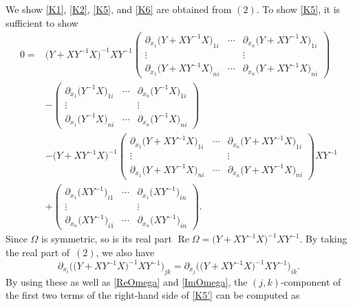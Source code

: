 \documentclass[10pt,a4paper]{amsart}
\numberwithin{equation}{section}
\def\re{\operatorname{Re}}
\begin{document}
We show \eqref{K1}, \eqref{K2}, \eqref{K5}, and \eqref{K6} are obtained from $(2)$. %
To show \eqref{K5}, it is sufficient to show
\begin{align}
0={}& \bigl(Y+XY^{-1}X\bigr)^{-1}XY^{-1}
\begin{pmatrix}
\partial_{x_1}\bigl(Y+XY^{-1}X\bigr)_{1i} & \cdots & \partial_{x_n}\bigl(Y+XY^{-1}X\bigr)_{1i} \\
\vdots & & \vdots \\
\partial_{x_1}\bigl(Y+XY^{-1}X\bigr)_{ni} & \cdots & \partial_{x_n}\bigl(Y+XY^{-1}X\bigr)_{ni}
\end{pmatrix} \nonumber \\
&-
\begin{pmatrix}
\partial_{x_1}\bigl(Y^{-1}X\bigr)_{1i} & \cdots & \partial_{x_n}\bigl(Y^{-1}X\bigr)_{1i} \\
\vdots & & \vdots \\
\partial_{x_1}\bigl(Y^{-1}X\bigr)_{ni} & \cdots & \partial_{x_n}\bigl(Y^{-1}X\bigr)_{ni}
\end{pmatrix} \nonumber \\
&-\bigl(Y+XY^{-1}X\bigr)^{-1}
\begin{pmatrix}
\partial_{x_1}\bigl(Y+XY^{-1}X\bigr)_{1i} & \cdots & \partial_{x_n}\bigl(Y+XY^{-1}X\bigr)_{1i} \\
\vdots & & \vdots \\
\partial_{x_1}\bigl(Y+XY^{-1}X\bigr)_{ni} & \cdots & \partial_{x_n}\bigl(Y+XY^{-1}X\bigr)_{ni}
\end{pmatrix}
XY^{-1}\nonumber \\
&+
\begin{pmatrix}
\partial_{x_1}\bigl(XY^{-1}\bigr)_{i1} & \cdots & \partial_{x_1}\bigl(XY^{-1}\bigr)_{in} \\
\vdots & & \vdots \\
\partial_{x_n}\bigl(XY^{-1}\bigr)_{i1} & \cdots & \partial_{x_n}\bigl(XY^{-1}\bigr)_{in}
\end{pmatrix}.\label{K5'}
\end{align}
Since $\Omega$ is symmetric, so is its real part $\re \Omega=\bigl(Y+XY^{-1}X\bigr)^{-1}XY^{-1}$. By taking the real part of~$(2)$, we also have
\[
\partial_{x_i}\bigl(\bigl(Y+XY^{-1}X\bigr)^{-1}XY^{-1}\bigr)_{jk}=\partial_{x_j}\bigl(\bigl(Y+XY^{-1}X\bigr)^{-1}XY^{-1}\bigr)_{ik}.
\]
By using these as well as \eqref{ReOmega} and \eqref{ImOmega}, the $(j, k)$-component of the first two terms of the right-hand side of \eqref{K5'} can be computed as
\end{document}
